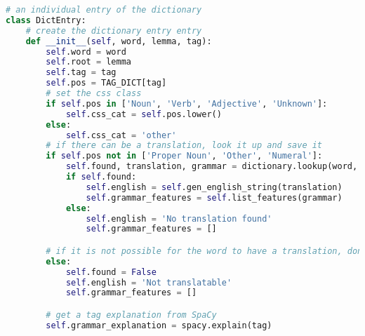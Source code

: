 \begin{lstlisting}[caption={[Gloss Generation Code] Python code used to generate the gloss content and organise so it can be formatted into a gloss item.}, label=lst:dict, breaklines=true, language=python, breakatwhitespace=true, float]
# an individual entry of the dictionary
class DictEntry:
    # create the dictionary entry entry
    def __init__(self, word, lemma, tag):
        self.word = word
        self.root = lemma
        self.tag = tag
        self.pos = TAG_DICT[tag]
        # set the css class
        if self.pos in ['Noun', 'Verb', 'Adjective', 'Unknown']:
            self.css_cat = self.pos.lower()
        else:
            self.css_cat = 'other'
        # if there can be a translation, look it up and save it
        if self.pos not in ['Proper Noun', 'Other', 'Numeral']:
            self.found, translation, grammar = dictionary.lookup(word, lemma, self.pos)
            if self.found:
                self.english = self.gen_english_string(translation)
                self.grammar_features = self.list_features(grammar)
            else:
                self.english = 'No translation found'
                self.grammar_features = []

        # if it is not possible for the word to have a translation, don't bother.
        else:
            self.found = False
            self.english = 'Not translatable'
            self.grammar_features = []

        # get a tag explanation from SpaCy
        self.grammar_explanation = spacy.explain(tag)
\end{lstlisting}
